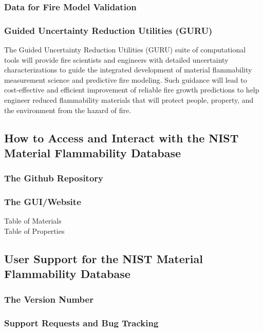 \subsubsection{Data for Fire Model Validation}
\subsubsection{Guided Uncertainty Reduction Utilities (GURU)}
The Guided Uncertainty Reduction Utilities (GURU) suite of computational tools will provide fire scientists and
engineers with detailed uncertainty characterizations to guide the integrated development of material flammability measurement science and predictive fire modeling. Such guidance will lead to cost-effective and efficient improvement of reliable fire growth predictions to help engineer reduced flammability materials that will protect people, property, and the environment from the hazard of fire.

\subsection{How to Access and Interact with the NIST Material Flammability Database} \label{sec:MFDB-user-interface}
\subsubsection{The Github Repository}
\subsubsection{The GUI/Website}
Table of Materials\\
Table of Properties\\


\subsection{User Support for the NIST Material Flammability Database} \label{ssec:MFDB-support}
\subsubsection{The Version Number}
\subsubsection{Support Requests and Bug Tracking}
